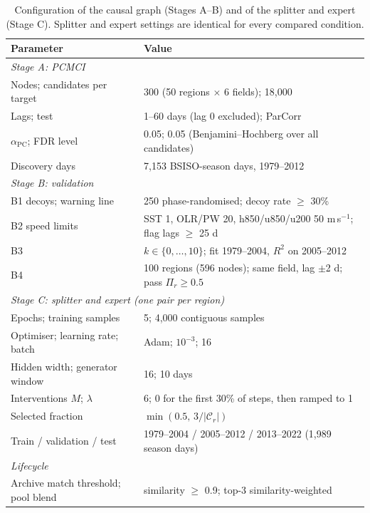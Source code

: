 \begin{table}[htbp]
\centering
\caption{Configuration of the causal graph (Stages A--B) and of the splitter and expert (Stage C). Splitter and expert settings are identical for every compared condition.}
\label{tab:config}
\footnotesize
\renewcommand{\arraystretch}{1.15}
\begin{tabular}{p{6.2cm}p{7.6cm}}
\toprule
\textbf{Parameter} & \textbf{Value} \\
\midrule
\multicolumn{2}{l}{\textit{Stage A: PCMCI}}\\
Nodes; candidates per target & 300 (50 regions $\times$ 6 fields); 18{,}000 \\
Lags; test & 1--60 days (lag 0 excluded); ParCorr \\
$\alpha_{\mathrm{PC}}$; FDR level & 0.05; 0.05 (Benjamini--Hochberg over all candidates) \\
Discovery days & 7{,}153 BSISO-season days, 1979--2012 \\
\multicolumn{2}{l}{\textit{Stage B: validation}}\\
B1 decoys; warning line & 250 phase-randomised; decoy rate $\ge$ 30\% \\
B2 speed limits & SST 1, OLR/PW 20, h850/u850/u200 50 m\,s$^{-1}$; flag lags $\ge$ 25 d \\
B3 & $k\in\{0,\dots,10\}$; fit 1979--2004, $R^2$ on 2005--2012 \\
B4 & 100 regions (596 nodes); same field, lag $\pm$2 d; pass $\Pi_r\ge0.5$ \\
\multicolumn{2}{l}{\textit{Stage C: splitter and expert (one pair per region)}}\\
Epochs; training samples & 5; 4{,}000 contiguous samples \\
Optimiser; learning rate; batch & Adam; $10^{-3}$; 16 \\
Hidden width; generator window & 16; 10 days \\
Interventions $M$; $\lambda$ & 6; 0 for the first 30\% of steps, then ramped to 1 \\
Selected fraction & $\min(0.5,\,3/|\mathcal{C}_r|)$ \\
Train / validation / test & 1979--2004 / 2005--2012 / 2013--2022 (1{,}989 season days) \\
\multicolumn{2}{l}{\textit{Lifecycle}}\\
Archive match threshold; pool blend & similarity $\ge$ 0.9; top-3 similarity-weighted \\
\bottomrule
\end{tabular}
\end{table}

